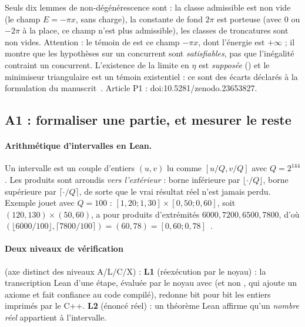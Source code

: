 \noindent Seuls dix lemmes de non-dégénérescence sont \tierAs{} : la classe admissible est non vide (le champ $E=-\pi x$,
sans charge), la constante de fond $2\pi$ est porteuse (avec $0$ ou $-2\pi$ à la place, ce champ n'est plus
admissible), les classes de troncatures sont non vides. Attention : le témoin de  est ce
champ $-\pi x$, dont l'énergie est $+\infty$ \tierC{} ; il montre que les hypothèses sur un concurrent sont
\emph{satisfiables}, pas que l'inégalité contraint un concurrent. L'existence de la limite en $\eta$ est \emph{supposée}
() et le minimiseur triangulaire est un témoin existentiel : ce sont des écarts déclarés à la
formulation du manuscrit~\cite{ch2ssa}. Article P1 : doi\string:10.5281/zenodo.23653827.

\subsection{A1 : formaliser une partie, et mesurer le reste}\label{ch2:ssec:a1}
\paragraph{Arithmétique d'intervalles en Lean.} Un intervalle est un couple d'entiers $(u,v)$ lu comme $[u/Q,v/Q]$ avec
$Q=2^{144}$. Les produits sont arrondis \emph{vers l'extérieur} : borne inférieure par $\lfloor\cdot/Q\rfloor$, borne
supérieure par $\lceil\cdot/Q\rceil$, de sorte que le vrai résultat réel n'est jamais perdu. Exemple jouet avec $Q=100$ :
$[1{,}20;1{,}30]\times[0{,}50;0{,}60]$, soit $(120,130)\times(50,60)$, a pour produits d'extrémités
$6000,7200,6500,7800$, d'où $(\lfloor6000/100\rfloor,\lceil7800/100\rceil)=(60,78)=[0{,}60;0{,}78]$~\cite{ch2ssl}.

\paragraph{Deux niveaux de vérification} (axe distinct des niveaux A/L/C/X) :
\textbf{L1} (réexécution par le noyau) : la transcription Lean d'une étape, évaluée par le noyau avec
 (et non , qui ajoute un axiome et fait confiance au code compilé), redonne
bit pour bit les entiers imprimés par le C++. \textbf{L2} (énoncé réel) : un théorème Lean affirme qu'un \emph{nombre
réel} appartient à l'intervalle.

